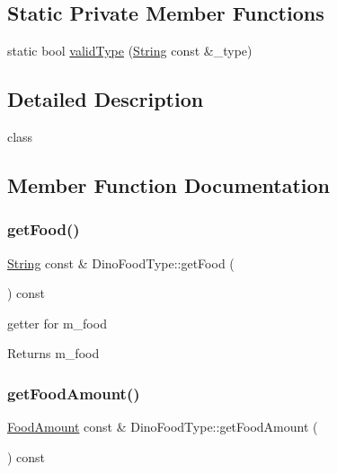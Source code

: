 \subsection*{Static Private Member Functions}
\begin{DoxyCompactItemize}
\item 
static bool \hyperlink{classDinoFoodType_a72f9411ead67e171a61268b499806b42}{valid\+Type} (\hyperlink{classString}{String} const \&\+\_\+type)
\end{DoxyCompactItemize}


\subsection{Detailed Description}
class 

\subsection{Member Function Documentation}
\mbox{\label{classDinoFoodType_aea2afe68c1b56bb7876604e1ec13af33}} 
\subsubsection{\texorpdfstring{get\+Food()}{getFood()}}
{\footnotesize\ttfamily \hyperlink{classString}{String} const  \& Dino\+Food\+Type\+::get\+Food (\begin{DoxyParamCaption}{ }\end{DoxyParamCaption}) const}

getter for m\+\_\+food \begin{DoxyReturn}{Returns}
m\+\_\+food 
\end{DoxyReturn}
\mbox{\label{classDinoFoodType_a974a248bce08baa48360b5b2c6858263}} 
\subsubsection{\texorpdfstring{get\+Food\+Amount()}{getFoodAmount()}}
{\footnotesize\ttfamily \hyperlink{DinoFoodType_8hpp_a81be3c5791355e37ef9afec946f6ff50}{Food\+Amount} const  \& Dino\+Food\+Type\+::get\+Food\+Amount (\begin{DoxyParamCaption}{ }\end{DoxyParamCaption}) const}

